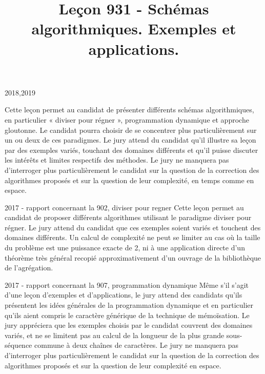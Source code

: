 \documentclass{agregfiche}
\title{Leçon 931 - Schémas algorithmiques.  Exemples et applications.}
\begin{document}
\maketitle

\secrapports

\begin{rapport}{2018,2019}

Cette leçon permet au candidat de présenter différents schémas algorithmiques, en particulier « diviser
pour régner », programmation dynamique et approche gloutonne. Le candidat pourra choisir de se
concentrer plus particulièrement sur un ou deux de ces paradigmes. Le jury attend du candidat qu’il
illustre sa leçon par des exemples variés, touchant des domaines différents et qu’il puisse discuter les
intérêts et limites respectifs des méthodes. Le jury ne manquera pas d’interroger plus particulièrement le
candidat sur la question de la correction des algorithmes proposés et sur la question de leur complexité,
en temps comme en espace.

\end{rapport}

\begin{rapport}{2017 - rapport concernant la 902, diviser pour regner}
Cette leçon permet au candidat de proposer différents algorithmes utilisant le paradigme diviser pour
régner. Le jury attend du candidat que ces exemples soient variés et touchent des domaines différents.
Un calcul de complexité ne peut se limiter au cas où la taille du problème est une puissance exacte de
2, ni à une application directe d’un théorème très général recopié approximativement d’un ouvrage de
la bibliothèque de l’agrégation.
\end{rapport}

\begin{rapport}{2017 - rapport concernant la 907, programmation dynamique}
Même s’il s’agit d’une leçon d’exemples et d’applications, le jury attend des candidats qu’ils présentent
les idées générales de la programmation dynamique et en particulier qu’ils aient compris le caractère
générique de la technique de mémoïsation. Le jury appréciera que les exemples choisis par le candidat
couvrent des domaines variés, et ne se limitent pas au calcul de la longueur de la plus grande sous-
séquence commune à deux chaînes de caractères.
Le jury ne manquera pas d’interroger plus particulièrement le candidat sur la question de la correction
des algorithmes proposés et sur la question de leur complexité en espace.
\end{rapport}
\end{document}
